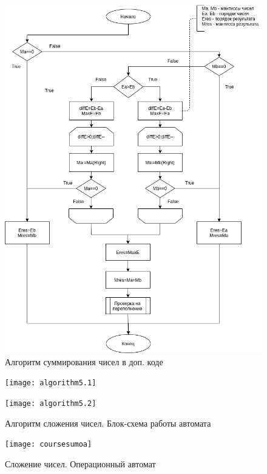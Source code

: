 \documentclass[a4paper,14pt]{extarticle}
\begin{document}
\begin{figure}[h!]
	\centering
	\includegraphics[width=0.7\linewidth]{images/course_algorithm_sum}
	\caption{Алгоритм суммирования чисел в доп. коде}
	\label{fig:coursealgorithmsum}
\end{figure}

\newpage
\begin{figure}[h!]
	\centering
	\texttt{[image: algorithm5.1]}
	\label{fig:coursealgorithmmachine1}
\end{figure}
\begin{figure}[h!]
	\centering
	\texttt{[image: algorithm5.2]}
	\caption {Алгоритм сложения чисел. Блок-схема работы автомата}
	\label{fig:coursealgorithmmachine2}
\end{figure}
\newpage
\begin{figure}[h!]
	\centering
		\texttt{[image: coursesumoa]}
	\caption{Сложение чисел. Операционный автомат}
	\label{fig:courseoperationautomat2}
\end{figure}
\end{document}
